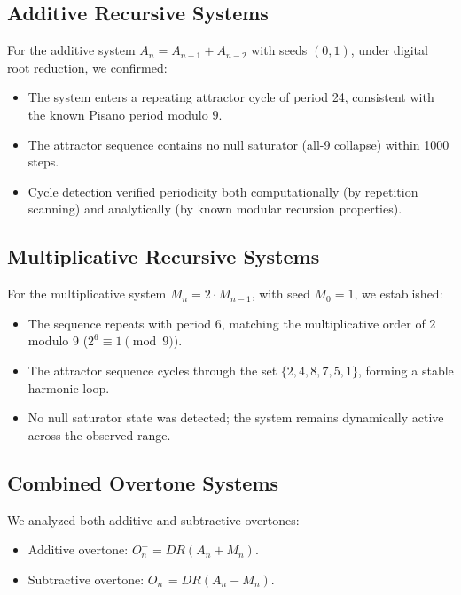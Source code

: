 \documentclass[12pt]{article}
\begin{document}
\subsection{Additive Recursive Systems}

For the additive system \( A_n = A_{n-1} + A_{n-2} \) with seeds \( (0,1) \), under digital root reduction, we confirmed:
\begin{itemize}
    \item The system enters a repeating attractor cycle of period 24, consistent with the known Pisano period modulo 9.
    \item The attractor sequence contains no null saturator (all-9 collapse) within 1000 steps.
    \item Cycle detection verified periodicity both computationally (by repetition scanning) and analytically (by known modular recursion properties).
\end{itemize}

\subsection{Multiplicative Recursive Systems}

For the multiplicative system \( M_n = 2 \cdot M_{n-1} \), with seed \( M_0 = 1 \), we established:
\begin{itemize}
    \item The sequence repeats with period 6, matching the multiplicative order of 2 modulo 9 (\( 2^6 \equiv 1 \pmod{9} \)).
    \item The attractor sequence cycles through the set \( \{2,4,8,7,5,1\} \), forming a stable harmonic loop.
    \item No null saturator state was detected; the system remains dynamically active across the observed range.
\end{itemize}

\subsection{Combined Overtone Systems}

We analyzed both additive and subtractive overtones:
\begin{itemize}
    \item Additive overtone: \( O_n^+ = DR(A_n + M_n) \).
    \item Subtractive overtone: \( O_n^- = DR(A_n - M_n) \).
\end{itemize}
\end{document}
